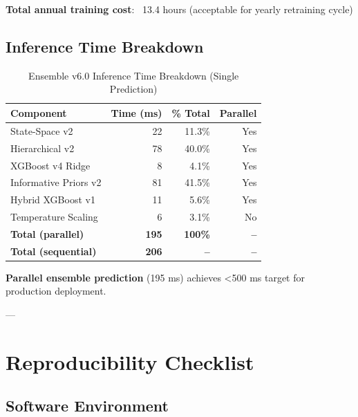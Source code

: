 \textbf{Total annual training cost}: ~13.4 hours (acceptable for yearly retraining cycle)

\subsection{Inference Time Breakdown}

\begin{table}[htbp]
\centering
\caption{Ensemble v6.0 Inference Time Breakdown (Single Prediction)}
\label{tab:inference-times}
\begin{tabular}{lrrr}
\toprule
\textbf{Component} & \textbf{Time (ms)} & \textbf{\% Total} & \textbf{Parallel} \\
\midrule
State-Space v2 & 22 & 11.3\% & Yes \\
Hierarchical v2 & 78 & 40.0\% & Yes \\
XGBoost v4 Ridge & 8 & 4.1\% & Yes \\
Informative Priors v2 & 81 & 41.5\% & Yes \\
Hybrid XGBoost v1 & 11 & 5.6\% & Yes \\
Temperature Scaling & 6 & 3.1\% & No \\
\midrule
\textbf{Total (parallel)} & \textbf{195} & \textbf{100\%} & \textbf{--} \\
\textbf{Total (sequential)} & \textbf{206} & \textbf{--} & \textbf{--} \\
\bottomrule
\end{tabular}
\end{table}

\textbf{Parallel ensemble prediction} (195 ms) achieves <500 ms target for production deployment.

---

\section{Reproducibility Checklist}

\subsection{Software Environment}

